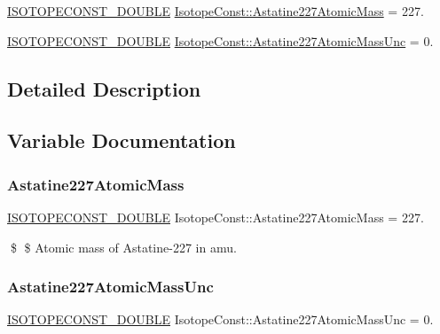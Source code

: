 \begin{DoxyCompactItemize}
\item 
\mbox{\hyperlink{group___isotope_const-_macros_ga8f45a7272ce02c0b4c65c44636ed719a}{I\+S\+O\+T\+O\+P\+E\+C\+O\+N\+S\+T\+\_\+\+D\+O\+U\+B\+LE}} \mbox{\hyperlink{group___isotope_const-_astatine-_at227_ga0721069ee293a30c688b94f295c01a60}{Isotope\+Const\+::\+Astatine227\+Atomic\+Mass}} = 227.
\item 
\mbox{\hyperlink{group___isotope_const-_macros_ga8f45a7272ce02c0b4c65c44636ed719a}{I\+S\+O\+T\+O\+P\+E\+C\+O\+N\+S\+T\+\_\+\+D\+O\+U\+B\+LE}} \mbox{\hyperlink{group___isotope_const-_astatine-_at227_ga331ed67a2921f9c87527aa3374476a85}{Isotope\+Const\+::\+Astatine227\+Atomic\+Mass\+Unc}} = 0.
\end{DoxyCompactItemize}


\subsection{Detailed Description}


\subsection{Variable Documentation}
\mbox{\label{group___isotope_const-_astatine-_at227_ga0721069ee293a30c688b94f295c01a60}} 
\subsubsection{\texorpdfstring{Astatine227\+Atomic\+Mass}{Astatine227AtomicMass}}
{\footnotesize\ttfamily \mbox{\hyperlink{group___isotope_const-_macros_ga8f45a7272ce02c0b4c65c44636ed719a}{I\+S\+O\+T\+O\+P\+E\+C\+O\+N\+S\+T\+\_\+\+D\+O\+U\+B\+LE}} Isotope\+Const\+::\+Astatine227\+Atomic\+Mass = 227.}

\$ \$ Atomic mass of Astatine-\/227 in amu. \mbox{\label{group___isotope_const-_astatine-_at227_ga331ed67a2921f9c87527aa3374476a85}} 
\subsubsection{\texorpdfstring{Astatine227\+Atomic\+Mass\+Unc}{Astatine227AtomicMassUnc}}
{\footnotesize\ttfamily \mbox{\hyperlink{group___isotope_const-_macros_ga8f45a7272ce02c0b4c65c44636ed719a}{I\+S\+O\+T\+O\+P\+E\+C\+O\+N\+S\+T\+\_\+\+D\+O\+U\+B\+LE}} Isotope\+Const\+::\+Astatine227\+Atomic\+Mass\+Unc = 0.}

